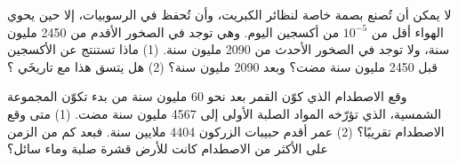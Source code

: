 \begin{exercise}[$\star\star\star$]\label{exo:g12:early-earth:14}
لا يمكن أن تُصنع بصمة خاصة لنظائر الكبريت، وأن تُحفظ في
الرسوبيات، إلا حين يحوي الهواء أقل من $10^{-5}$ من أكسجين اليوم. وهي
توجد في الصخور الأقدم من 2450 مليون سنة، ولا توجد في الصخور الأحدث من
2090 مليون سنة. (1) ماذا تستنتج عن الأكسجين قبل 2450
مليون سنة مضت؟ وبعد 2090 مليون سنة؟ (2) هل يتسق هذا مع
تاريخَي ؟
\end{exercise}

\begin{exercise}[$\star\star\star$]\label{exo:g12:early-earth:15}
وقع الاصطدام الذي كوّن القمر بعد نحو 60 مليون سنة من بدء تكوّن المجموعة
الشمسية، الذي تؤرّخه المواد الصلبة الأولى إلى 4567 مليون سنة مضت.
(1) متى وقع الاصطدام تقريبًا؟ (2) عمر أقدم حبيبات الزركون \num{4404}
ملايين سنة. فبعد كم من الزمن على الأكثر من الاصطدام كانت للأرض
قشرة صلبة وماء سائل؟
\end{exercise}

